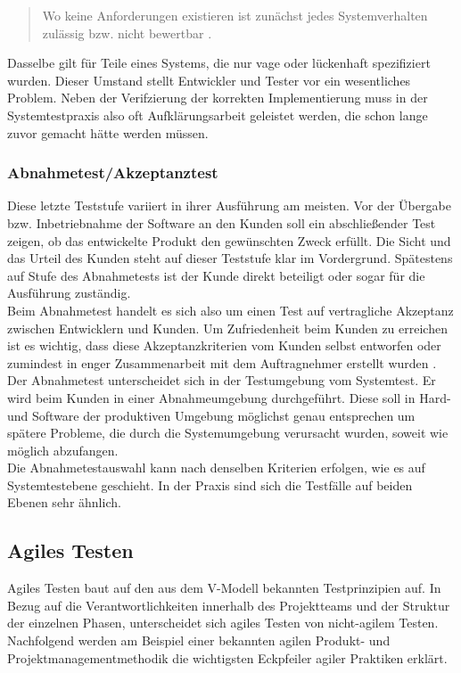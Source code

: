 \begin{quote}
Wo keine Anforderungen existieren ist zunächst jedes Systemverhalten zulässig bzw. nicht bewertbar \cite{spillner_basiswissen_2012}.
\end{quote}
Dasselbe gilt für Teile eines Systems, die nur vage oder lückenhaft spezifiziert wurden. Dieser Umstand stellt Entwickler und Tester vor ein wesentliches Problem. Neben der Verifzierung der korrekten Implementierung muss in der Systemtestpraxis also oft Aufklärungsarbeit geleistet werden, die schon lange zuvor gemacht hätte werden müssen.

\subsubsection{Abnahmetest/Akzeptanztest}
Diese letzte Teststufe variiert in ihrer Ausführung am meisten. Vor der Übergabe bzw. Inbetriebnahme der Software an den Kunden soll ein abschließender Test zeigen, ob das entwickelte Produkt den gewünschten Zweck erfüllt. Die Sicht und das Urteil des Kunden steht auf dieser Teststufe klar im Vordergrund. Spätestens auf Stufe des Abnahmetests ist der Kunde direkt beteiligt oder sogar für die Ausführung zuständig.\\
Beim Abnahmetest handelt es sich also um einen Test auf vertragliche Akzeptanz zwischen Entwicklern und Kunden. Um Zufriedenheit beim Kunden zu erreichen ist es wichtig, dass diese Akzeptanzkriterien vom Kunden selbst entworfen oder zumindest in enger Zusammenarbeit mit dem Auftragnehmer erstellt wurden \cite{spillner_basiswissen_2012}. Der Abnahmetest unterscheidet sich in der Testumgebung vom Systemtest. Er wird beim Kunden in einer Abnahmeumgebung durchgeführt. Diese soll in Hard- und Software der produktiven Umgebung möglichst genau entsprechen um spätere Probleme, die durch die Systemumgebung verursacht wurden, soweit wie möglich abzufangen.\\
Die Abnahmetestauswahl kann nach denselben Kriterien erfolgen, wie es auf Systemtestebene geschieht. In der Praxis sind sich die Testfälle auf beiden Ebenen sehr ähnlich.

\subsection{Agiles Testen}
Agiles Testen baut auf den aus dem V-Modell bekannten Testprinzipien auf. In Bezug auf die Verantwortlichkeiten innerhalb des Projektteams und der Struktur der einzelnen Phasen, unterscheidet sich agiles Testen von nicht-agilem Testen. Nachfolgend werden am Beispiel einer bekannten agilen Produkt- und Projektmanagementmethodik die wichtigsten Eckpfeiler agiler Praktiken erklärt.

